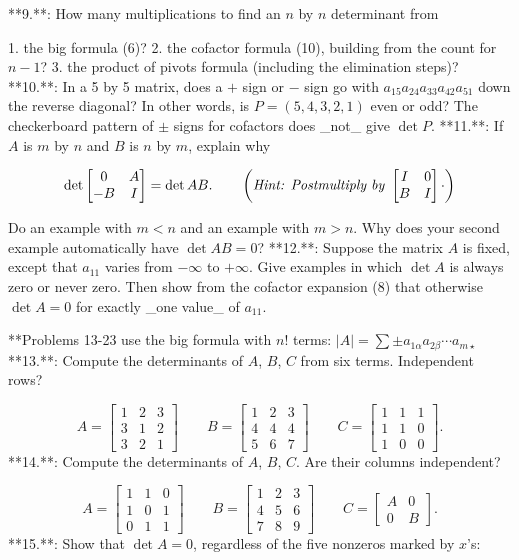 

**9.**: How many multiplications to find an \(n\) by \(n\) determinant from

1. the big formula (6)?
2. the cofactor formula (10), building from the count for \(n-1\)?
3. the product of pivots formula (including the elimination steps)?
**10.**: In a 5 by 5 matrix, does a \(+\) sign or \(-\) sign go with \(a_{15}a_{24}a_{33}a_{42}a_{51}\) down the reverse diagonal? In other words, is \(P=(5,4,3,2,1)\) even or odd? The checkerboard pattern of \(\pm\) signs for cofactors does _not_ give \(\det P\).
**11.**: If \(A\) is \(m\) by \(n\) and \(B\) is \(n\) by \(m\), explain why

\[\det\begin{bmatrix}0&A\\ -B&I\end{bmatrix}=\det AB.\qquad\left(\text{\em Hint: Postmultiply by } \begin{bmatrix}I&0\\ B&I\end{bmatrix}\cdot\right)\]

Do an example with \(m<n\) and an example with \(m>n\). Why does your second example automatically have \(\det AB=0\)?
**12.**: Suppose the matrix \(A\) is fixed, except that \(a_{11}\) varies from \(-\infty\) to \(+\infty\). Give examples in which \(\det A\) is always zero or never zero. Then show from the cofactor expansion (8) that otherwise \(\det A=0\) for exactly _one value_ of \(a_{11}\).

**Problems 13-23 use the big formula with \(n!\) terms: \(|A|=\sum\pm a_{1\alpha}a_{2\beta}\cdots a_{m\star}\)**13.**: Compute the determinants of \(A\), \(B\), \(C\) from six terms. Independent rows?

\[A=\begin{bmatrix}1&2&3\\ 3&1&2\\ 3&2&1\end{bmatrix}\qquad B=\begin{bmatrix}1&2&3\\ 4&4&4\\ 5&6&7\end{bmatrix}\qquad C=\begin{bmatrix}1&1&1\\ 1&1&0\\ 1&0&0\end{bmatrix}.\]
**14.**: Compute the determinants of \(A\), \(B\), \(C\). Are their columns independent?

\[A=\begin{bmatrix}1&1&0\\ 1&0&1\\ 0&1&1\end{bmatrix}\qquad B=\begin{bmatrix}1&2&3\\ 4&5&6\\ 7&8&9\end{bmatrix}\qquad C=\begin{bmatrix}A&0\\ 0&B\end{bmatrix}.\]
**15.**: Show that \(\det A=0\), regardless of the five nonzeros marked by \(x\)'s:


